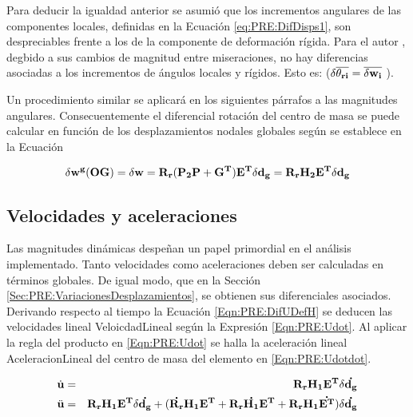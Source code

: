  Para deducir la igualdad anterior se asumió que los incrementos angulares de las componentes locales, definidas en la Ecuación \eqref{eq:PRE:DifDisps1}, son despreciables frente a los de la componente de deformación rígida. Para el autor \cite{Le2014}, degbido a sus cambios de magnitud entre miseraciones, no hay diferencias asociadas a los incrementos de ángulos locales y rígidos. Esto es: ($\delta \overline{\bf{\theta}_{ri}}= \overline{\delta \bf{w}_i}$ ).
 
 Un procedimiento similar se aplicará en los siguientes párrafos a las magnitudes angulares. Consecuentemente el diferencial rotación del centro de masa se puede calcular en función de los desplazamientos nodales globales según se establece en la Ecuación 
 
 \begin{equation}\label{Eqn:PRE:AngularBaricentro}
 	\delta \bf{w^g} (OG) =\delta \bf{w} =\bf{R}_r (\bf{P}_2\bf{P}+\bf{G}^T)\bf{E}^T\delta \bf{d}_g = \bf{R}_r\bf{H}_2\bf{E}^T \delta \bf{d}_g
 \end{equation}
 
 
 
\subsection{Velocidades y aceleraciones}\label{Sec:PRE:VelAc}

Las magnitudes dinámicas despeñan un papel primordial en el análisis implementado. Tanto velocidades como aceleraciones deben ser calculadas en términos globales. De igual modo, que en la Sección \ref{Sec:PRE:VariacionesDesplazamientos}, se obtienen sus diferenciales asociados. Derivando respecto al tiempo la Ecuación \eqref{Eqn:PRE:DifUDefH} se deducen las velocidades lineal \gls{VeloicdadLineal} según la Expresión \eqref{Eqn:PRE:Udot}. Al aplicar la regla del producto en \eqref{Eqn:PRE:Udot} se halla la aceleración lineal \gls{AceleracionLineal} del centro de masa del elemento en \eqref{Eqn:PRE:Udotdot}. 

 \begin{eqnarray}
 	\label{Eqn:PRE:Udot}
	\dot{\bf{u}} &=&\bf{R}_r \bf{H}_1 \bf{E}^T \delta \dot{ \bf{d}_g }\\
	\label{Eqn:PRE:Udotdot}
	\ddot{\bf{u}}& = &\bf{R}_r \bf{H}_1 \bf{E}^T \delta \dot{ \bf{d}_g }+ (\dot{\bf{R}_r} \bf{H}_1 \bf{E}^T+\bf{R}_r \dot{\bf{H}_1} \bf{E}^T+\bf{R}_r \bf{H}_1 \dot{\bf{E}^T})\delta \dot{ \bf{d}_g }	
\end{eqnarray}

